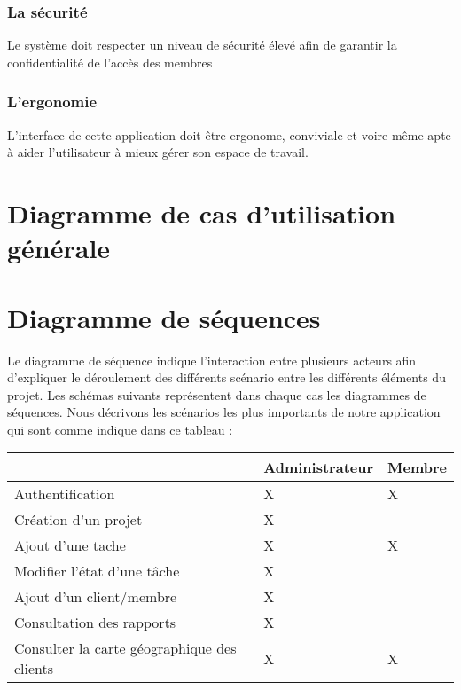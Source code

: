 \subsubsection{La s\'{e}curit\'{e}}

Le syst\`{e}me doit respecter un niveau de s\'{e}curit\'{e} \'{e}lev\'{e} afin de garantir la
confidentialit\'{e} de l'acc\`{e}s des membres

\subsubsection{L'ergonomie }

L'interface de cette application doit \^{e}tre ergonome, conviviale et voire m\^{e}me
apte \`{a} aider l'utilisateur \`{a} mieux g\'{e}rer son espace de travail.


\section{ Diagramme de cas d'utilisation g\'{e}n\'{e}rale }


\section{ Diagramme de s\'{e}quences }

Le diagramme de s\'{e}quence indique l'interaction entre plusieurs acteurs
afin d'expliquer le d\'{e}roulement des diff\'{e}rents sc\'{e}nario entre les diff\'{e}rents
\'{e}l\'{e}ments du projet. Les sch\'{e}mas suivants repr\'{e}sentent dans chaque cas les
diagrammes de s\'{e}quences.
Nous  d\'{e}crivons les sc\'{e}narios les plus importants de notre application qui sont
comme indique dans ce tableau :

\FloatBarrier
\begin{table}[H]
\centering
\begin{tabular}{|l|l|l|}
\hline
                                            & Administrateur & Membre  \\
\hline
Authentification~                           & X              & X       \\
\hline
Création d’un projet                        & X              &         \\
\hline
Ajout d’une tache                           & X              & X       \\
\hline
Modifier l’état d’une tâche                 & X              &         \\
\hline
Ajout d’un client/membre                    & X              &         \\
\hline
Consultation des rapports                   & X              &         \\
\hline
Consulter la carte géographique des clients & X              & X       \\
\hline
\end{tabular}
\end{table}
\FloatBarrier


